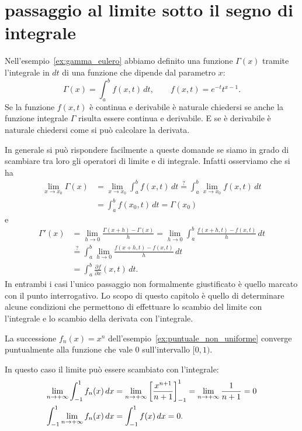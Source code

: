 \section{passaggio al limite sotto il segno di integrale}
\label{sec:scambio_integrale_limite}%

Nell'esempio~\ref{ex:gamma_eulero} abbiamo definito una 
funzione $\Gamma(x)$ tramite l'integrale in $dt$ di una funzione 
che dipende dal parametro $x$:
\[
  \Gamma(x) = \int_a^b f(x,t)\, dt, \qquad 
  f(x,t) = e^{-t}t^{x-1}.
\] 
Se la funzione $f(x,t)$ è continua e derivabile
è naturale chiedersi se anche la funzione integrale $\Gamma$ 
risulta essere continua e derivabile. 
E se è derivabile è naturale chiedersi come si può calcolare
la derivata.

In generale si può rispondere facilmente a queste domande se siamo in grado di 
scambiare tra loro gli operatori di limite e di integrale. 
Infatti osserviamo che 
si ha 
\begin{align*}
  \lim_{x\to x_0} \Gamma(x) 
  &= \lim_{x\to x_0} \int_a^b f(x,t)\, dt 
  \stackrel{?}= \int_a^b \lim_{x\to x_0} f(x,t)\, dt\\
  &= \int_a^b f(x_0,t)\, dt
  = \Gamma(x_0)
\end{align*}
e 
\begin{align*}
  \Gamma'(x) 
  &= \lim_{h\to 0}\frac{\Gamma(x+h) - \Gamma(x)}{h} 
  = \lim_{h\to 0} \int_a^b \frac{f(x+h,t)-f(x,t)}{h}\, dt \\
  &\stackrel{?}= \int_a^b \lim_{h\to 0}\frac{f(x+h,t)-f(x,t)}{h}\, dt \\
  &= \int_a^b \frac{\partial f}{\partial x}(x,t)\, dt.
\end{align*}
In entrambi i casi l'unico passaggio non formalmente giustificato è quello marcato
con il punto interrogativo. 
Lo scopo di questo capitolo è quello di determinare alcune condizioni che permettono 
di effettuare lo scambio del limite con l'integrale e lo scambio della derivata con l'integrale.


\begin{example}%
La successione $f_n(x)=x^n$ dell'esempio~\ref{ex:puntuale_non_uniforme}
converge puntualmente alla funzione che vale $0$ sull'intervallo $[0,1)$.

In questo caso il limite può essere scambiato con l'integrale:
\begin{align*}
\lim_{n\to +\infty} \int_{-1}^1 f_n(x)\, dx 
&= \lim_{n\to+\infty} {\left[ \frac{x^{n+1}}{n+1} \right]}_{-1}^1
 = \lim_{n\to+\infty} \frac{1}{n+1} = 0 \\
\int_{-1}^1 \lim_{n\to+\infty} f_n(x)\, dx 
&= \int_{-1}^1 f(x)\, dx = 0.
\end{align*}
\end{example}

